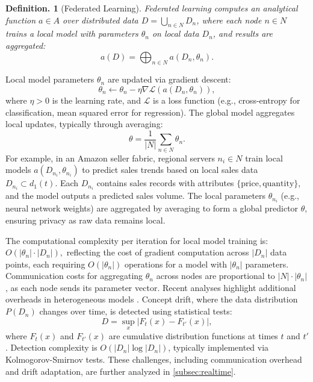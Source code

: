 \documentclass{amsart}
\newtheorem{defn}[thm]{Definition.}
\begin{document}
\begin{defn}[Federated Learning]
\label{subsec:federated_learning}
\emph{Federated learning} computes an analytical function \( a \in A \) over distributed data \( D = \bigcup_{n \in N} D_n \), where each node \( n \in N \) trains a local model with parameters \( \theta_n \) on local data \( D_n \), and results are aggregated:
\[
a(D) = \bigoplus_{n \in N} a(D_n, \theta_n).
\]
\end{defn}

Local model parameters \( \theta_n \) are updated via gradient descent:
\[
\theta_n \gets \theta_n - \eta \nabla \mathcal{L}(a(D_n, \theta_n)),
\]
where \( \eta > 0 \) is the learning rate, and \( \mathcal{L} \) is a loss function (e.g., cross-entropy for classification, mean squared error for regression). The global model aggregates local updates, typically through averaging:
\[
\theta = \frac{1}{|N|} \sum_{n \in N} \theta_n.
\]
For example, in an Amazon seller fabric, regional servers \( n_i \in N \) train local models \( a(D_{n_i}, \theta_{n_i}) \) to predict sales trends based on local sales data \( D_{n_i} \subset d_1(t) \). Each \( D_{n_i} \) contains sales records with attributes \( \{\text{price}, \text{quantity}\} \), and the model outputs a predicted sales volume. The local parameters \( \theta_{n_i} \) (e.g., neural network weights) are aggregated by averaging to form a global predictor \( \theta \), ensuring privacy as raw data remains local.

The computational complexity per iteration for local model training is:
$
O(|\theta_n| \cdot |D_n|),
$
reflecting the cost of gradient computation across \( |D_n| \) data points, each requiring \( O(|\theta_n|) \) operations for a model with \( |\theta_n| \) parameters. Communication costs for aggregating \( \theta_n \) across nodes are proportional to \( |N| \cdot |\theta_n| \), as each node sends its parameter vector. Recent analyses highlight additional overheads in heterogeneous models \cite{sciencedirect2025fedhm}. Concept drift, where the data distribution \( P(D_n) \) changes over time, is detected using statistical tests:
\[
D = \sup_x |F_t(x) - F_{t'}(x)|,
\]
where \( F_t(x) \) and \( F_{t'}(x) \) are cumulative distribution functions at times \( t \) and \( t' \). Detection complexity is \( O(|D_n| \log |D_n|) \), typically implemented via Kolmogorov-Smirnov tests. These challenges, including communication overhead and drift adaptation, are further analyzed in \cref{subsec:realtime}.
\end{document}
